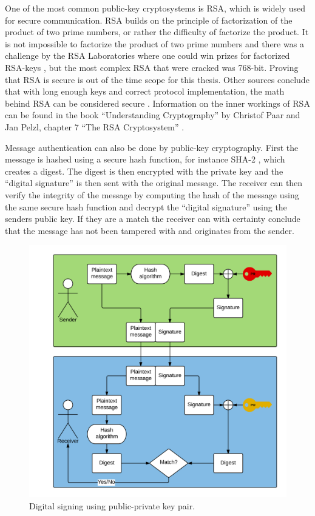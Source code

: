 One of the most common public-key cryptosystems is RSA, which is widely used for secure communication. RSA builds on the principle of factorization of the product of two prime numbers, or rather the difficulty of factorize the product. It is not impossible to factorize the product of two prime numbers and there was a challenge by the RSA Laboratories where one could win prizes for factorized RSA-keys \cite{rsaChallenge}, but the most complex RSA that were cracked was 768-bit. Proving that RSA is secure is out of the time scope for this thesis. Other sources conclude that with long enough keys and correct protocol implementation, the math behind RSA can be considered secure \cite[~p. 194]{cryptoMath}. Information on the inner workings of RSA can be found in the book ``Understanding Cryptography'' by Christof Paar and Jan Pelzl, chapter 7 ``The RSA Cryptosystem'' \cite{cryptoMath}.

Message authentication can also be done by public-key cryptography. First the message is hashed using a secure hash function, for instance SHA-2 \cite{shaRFC}, which creates a digest. The digest is then encrypted with the private key and the ``digital signature'' is then sent with the original message. The receiver can then verify the integrity of the message by computing the hash of the message using the same secure hash function and decrypt the ``digital signature'' using the senders public key. If they are a match the receiver can with certainty conclude that the message has not been tampered with and originates from the sender.

\begin{figure}[h!]
  \captionsetup{justification=centering,margin=1.5cm}
  \caption{Digital signing using public-private key pair.}
  \label{fig:signing_basic}
  \centering
    \includegraphics[width=1\textwidth]{images/signing_basic.png}
\end{figure}

